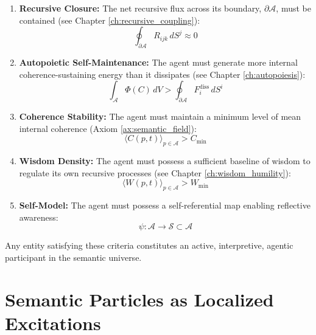 \begin{enumerate}
    \item \textbf{Recursive Closure:} The net recursive flux across its boundary, \(\partial \mathcal{A}\), must be contained (see Chapter \ref{ch:recursive_coupling}):
    \begin{equation}
        \oint_{\partial \mathcal{A}} R_{ijk} \, dS^j \approx 0
    \end{equation}
    \item \textbf{Autopoietic Self-Maintenance:} The agent must generate more internal coherence-sustaining energy than it dissipates (see Chapter \ref{ch:autopoiesis}):
    \begin{equation}
        \int_{\mathcal{A}} \Phi(C) \, dV > \oint_{\partial \mathcal{A}} F_i^{\text{diss}} \, dS^i
    \end{equation}
    \item \textbf{Coherence Stability:} The agent must maintain a minimum level of mean internal coherence (Axiom \ref{ax:semantic_field}):
    \begin{equation}
        \langle C(p,t) \rangle_{p \in \mathcal{A}} > C_{\text{min}}
    \end{equation}
    \item \textbf{Wisdom Density:} The agent must possess a sufficient baseline of wisdom to regulate its own recursive processes (see Chapter \ref{ch:wisdom_humility}):
    \begin{equation}
        \langle W(p,t) \rangle_{p \in \mathcal{A}} > W_{\text{min}}
    \end{equation}
    \item \textbf{Self-Model:} The agent must possess a self-referential map enabling reflective awareness:
    \begin{equation}
        \psi: \mathcal{A} \to \mathcal{S} \subset \mathcal{A}
    \end{equation}
\end{enumerate}

Any entity satisfying these criteria constitutes an active, interpretive, agentic participant in the semantic universe.


\section{Semantic Particles as Localized Excitations}


